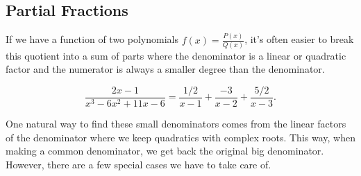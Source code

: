 \subsection{Partial Fractions}
\noindent
If we have a function of two polynomials $f(x) = \frac{P(x)}{Q(x)}$, it's often easier to break this quotient into a sum of parts where the denominator is a linear or quadratic factor and the numerator is always a smaller degree than the denominator.

\begin{example}
	\begin{equation*}
		\frac{2x-1}{x^3-6x^2+11x-6} = \frac{1/2}{x-1}+\frac{-3}{x-2}+\frac{5/2}{x-3}.
	\end{equation*}
\end{example}

\noindent
One natural way to find these small denominators comes from the linear factors of the denominator where we keep quadratics with complex roots.
This way, when making a common denominator, we get back the original big denominator.
However, there are a few special cases we have to take care of.






